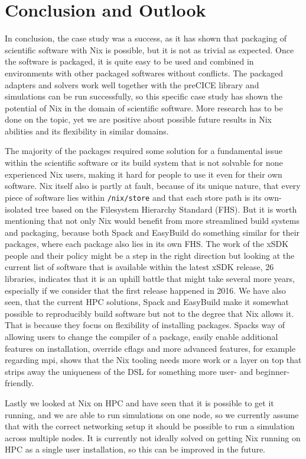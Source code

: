\documentclass{eceasst}
\begin{document}
\section{Conclusion and Outlook}

In conclusion, the case study was a success, as it has shown that packaging of scientific software with Nix is possible, but it is not as trivial as expected.
Once the software is packaged, it is quite easy to be used and combined in environments with other packaged softwares without conflicts.
The packaged adapters and solvers work well together with the preCICE library and simulations can be run successfully, so this specific case study has shown the potential of Nix in the domain of scientific software.
More research has to be done on the topic, yet we are positive about possible future results in Nix abilities and its flexibility in similar domains.

The majority of the packages required some solution for a fundamental issue within the scientific software or its build system that is not solvable for none experienced Nix users, making it hard for people to use it even for their own software.
Nix itself also is partly at fault, because of its unique nature, that every piece of software lies within \texttt{/nix/store} and that each store path is its own-isolated tree based on the Filesystem Hierarchy Standard (FHS).
But it is worth mentioning that not only Nix would benefit from more streamlined build systems and packaging, because both Spack and EasyBuild do something similar for their packages, where each package also lies in its own FHS.
The work of the xSDK people and their policy might be a step in the right direction but looking at the current list of software that is available within the latest xSDK release, 26 libraries, indicates that it is an uphill battle that might take several more years, especially if we consider that the first release happened in 2016.
We have also seen, that the current HPC solutions, Spack and EasyBuild make it somewhat possible to reproducibly build software but not to the degree that Nix allows it.
That is because they focus on flexibility of installing packages.
Spacks way of allowing users to change the compiler of a package, easily enable additional features on installation, override cflags and more advanced features, for example regarding mpi, shows that the Nix tooling needs more work or a layer on top that strips away the uniqueness of the DSL for something more user- and beginner-friendly.

Lastly we looked at Nix on HPC and have seen that it is possible to get it running, and we are able to run simulations on one node, so we currently assume that with the correct networking setup it should be possible to run a simulation across multiple nodes.
It is currently not ideally solved on getting Nix running on HPC as a single user installation, so this can be improved in the future.
\end{document}
